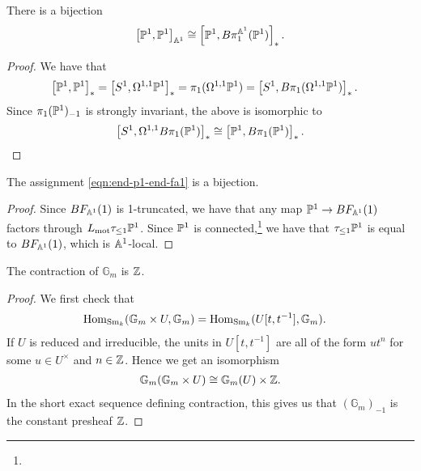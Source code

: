 \documentclass[11pt,openany]{book}
\begin{document}
\begin{proposition} There is a bijection
\begin{align*}
    \left[ \P^1,\P^1 \right]_{\A^1} \cong \left[ \P^1, B\pi_1^{\A^1}(\P^1) \right]_\ast.
\end{align*}
\end{proposition}
\begin{proof} We have that
\begin{align*}
     \left[ \P^1,\P^1 \right]_\ast &= \left[ S^1, \Omega^{1,1} \P^1 \right]_\ast = \pi_1(\Omega^{1,1}\P^1) = \left[ S^1, B\pi_1(\Omega^{1,1} \P^1) \right]_\ast.
\end{align*}
Since $\pi_1(\P^1)_{-1}$ is strongly invariant, the above is isomorphic to
\begin{align*}
    \left[ S^1, \Omega^{1,1} B\pi_1(\P^1) \right]_\ast \cong \left[ \P^1, B \pi_1(\P^1) \right]_\ast.
\end{align*}
\end{proof}


\begin{corollary} The assignment \autoref{eqn:end-p1-end-fa1} is a bijection.
\end{corollary}
\begin{proof} Since $BF_{\A^1}(1)$ is 1-truncated, we have that any map $\P^1 \to BF_{\A^1}(1)$ factors through $L_\mot \tau_{\le 1} \P^1$. Since $\P^1$ is connected,\footnote{} we have that $\tau_{\le 1} \P^1$ is equal to $BF_{\A^1}(1)$, which is $\A^1$-local.
\end{proof}

\begin{proposition} The contraction of $\mathbb{G}_m$ is $\Z$.
\end{proposition}
\begin{proof} We first check that
\begin{align*}
    \Hom_{\Sm_k}(\mathbb{G}_m \times U, \mathbb{G}_m) &= \Hom_{\Sm_k}(U[t,t^{-1}],\mathbb{G}_m).
\end{align*}
If $U$ is reduced and irreducible, the units in $U[t,t^{-1}]$ are all of the form $u t^n$ for some $u \in U^\times$ and $n\in \Z$. Hence we get an isomorphism
\begin{align*}
    \mathbb{G}_m(\mathbb{G}_m \times U) \cong \mathbb{G}_m(U) \times \Z.
\end{align*}
In the short exact sequence defining contraction, this gives us that $(\mathbb{G}_m)_{-1}$ is the constant presheaf $\Z$.
\end{proof}
\end{document}
